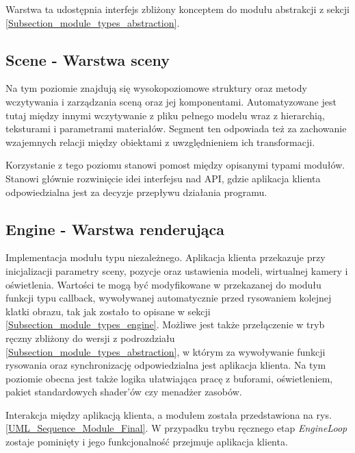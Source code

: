 Warstwa ta udostępnia interfejs zbliżony konceptem do modułu abstrakcji z sekcji \ref{Subsection_module_types_abstraction}. 

\subsection{\textbf{Scene} - Warstwa sceny}
Na tym poziomie znajdują się wysokopoziomowe struktury oraz metody wczytywania i zarządzania sceną oraz jej komponentami. Automatyzowane jest tutaj między innymi wczytywanie z pliku pełnego modelu wraz z hierarchią, teksturami i parametrami materiałów. Segment ten odpowiada też za zachowanie wzajemnych relacji między obiektami z uwzględnieniem ich transformacji.

Korzystanie z tego poziomu stanowi pomost między opisanymi typami modułów. Stanowi głównie rozwinięcie idei interfejsu nad API, gdzie aplikacja klienta odpowiedzialna jest za decyzje przepływu działania programu.

\subsection{\textbf{Engine} - Warstwa renderująca}
Implementacja modułu typu niezależnego. Aplikacja klienta przekazuje przy inicjalizacji parametry sceny, pozycje oraz ustawienia modeli, wirtualnej kamery i oświetlenia. Wartości te mogą być modyfikowane w przekazanej do modułu funkcji typu callback, wywoływanej automatycznie przed rysowaniem kolejnej klatki obrazu, tak jak zostało to opisane w sekcji \ref{Subsection_module_types_engine}. Możliwe jest także przełączenie w tryb ręczny zbliżony do wersji z podrozdziału \ref{Subsection_module_types_abstraction}, w którym za wywoływanie funkcji rysowania oraz synchronizację odpowiedzialna jest aplikacja klienta. Na tym poziomie obecna jest także logika ułatwiająca pracę z buforami, oświetleniem, pakiet standardowych shader'ów czy menadżer zasobów.

Interakcja między aplikacją klienta, a modułem została przedstawiona na rys. \ref{UML_Sequence_Module_Final}. W przypadku trybu ręcznego etap \textit{EngineLoop} zostaje pominięty i jego funkcjonalność przejmuje aplikacja klienta.

